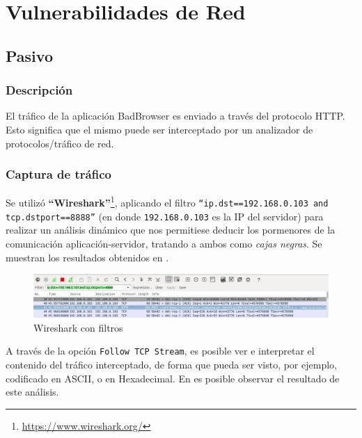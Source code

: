 \documentclass[11pt, a4paper, twoside]{article}
\begin{document}
%
%
\clearpage
{}
\section{Vulnerabilidades de Red}
%
%
\subsection{Pasivo}
\subsubsection{Descripción}
El tráfico de la aplicación BadBrowser es enviado a través del protocolo HTTP. Esto significa que el mismo puede ser interceptado por un analizador de protocolos/tráfico de red.

\subsubsection{Captura de tráfico}
Se utilizó \textbf{``Wireshark''}\footnote{\url{https://www.wireshark.org/}}, aplicando el filtro \texttt{``ip.dst==192.168.0.103 and tcp.dstport==8888''} (en donde \texttt{192.168.0.103} es la IP del servidor) para realizar un análisis dinámico que nos permitiese deducir los pormenores de la comunicación aplicación-servidor, tratando a ambos como \emph{cajas negras}. Se muestran los resultados obtenidos en .

\begin{center}
\begin{figure}[H]
\includegraphics[width=\textwidth]{wireshark-filtro.png}
\caption{Wireshark con filtros}
\label{fig:wireshark-filtro}
\end{figure}
\end{center}

A través de la opción \texttt{Follow TCP Stream}, es posible ver e interpretar el contenido del tráfico interceptado, de forma que pueda ser visto, por ejemplo, codificado en ASCII, o en Hexadecimal. En  es posible observar el resultado de este análisis.
\end{document}
